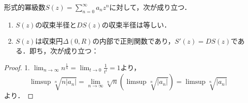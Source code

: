 \documentclass[uplatex, dvipdfmx]{jsreport}
\begin{document}
\begin{theorem}[冪級数は項別微分できる]\label{thm-冪級数は項別微分できる}\label{命題-6.1.2}
    形式的冪級数$S(z)=\sum^\infty_{n=0}a_nz^n$に対して，次が成り立つ．
    \begin{enumerate}
        \item $S(z)$の収束半径と$DS(z)$の収束半径は等しい．
        \item $S(z)$は収束円$\Delta(0,R)$の内部で正則関数であり，$S'(z)=DS(z)$である．即ち，次が成り立つ：
        \[  \]
    \end{enumerate}
\end{theorem}
\begin{proof}
    1. $\lim_{n\to\infty}n^{\frac{1}{n}}=\lim_{t\to 0}\frac{1}{t^t}=1$より，
    \[ \limsup\sqrt[n]{n|a_n|}=\lim_{n\to\infty}\sqrt[n]{n}(\limsup\sqrt[n]{|a_n|})=\limsup\sqrt[n]{|a_n|} \]
    より．


\end{proof}
\end{document}

